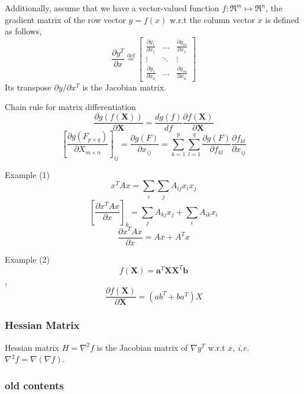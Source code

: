  Additionally, assume that we have a vector-valued function
 $f:\Re^m\mapsto\Re^n$, the gradient matrix of the row vector
 $y=f(x)$ w.r.t the column vector $x$ is defined as follows,
 $$ \frac{\partial y^T}{\partial x} \overset{\text{def}}{=} \begin{bmatrix}
	 \frac{\partial y_1}{\partial x_1} & \ldots &
		\frac{\partial y_m}{\partial x_1} \\
	\vdots & \ddots & \vdots \\
	 \frac{\partial y_1}{\partial x_n} & \ldots &
		\frac{\partial y_m}{\partial x_n} \end{bmatrix}$$
 Its transpose $\partial y/\partial x^T$ is the Jacobian matrix.

 Chain rule for matrix differentiation
 $$\frac{\partial g(f(\mathbf{X}))}{\partial \mathbf{X}} =
 \frac{dg(f)}{df} \frac{\partial f(\mathbf{X})}{\partial \mathbf{X}}$$
 $$[\frac{\partial g(F_{p\times q})}{\partial X_{m\times n}}]_{ij} = \frac{\partial g(F)}{\partial x_{ij}}
 = \sum_{k=1}^p \sum_{l=1}^q \frac{\partial g(F)}{\partial f_{kl}}
 \frac{\partial f_{kl}}{\partial x_{ij}}$$


 Example (1) $$x^TAx = \sum_i \sum_j A_{ij} x_i x_j$$
 $$[\frac{\partial x^TAx}{\partial x}]_k = \sum_j A_{kj}x_j + \sum_i A_{ik}x_i$$
 $$\frac{\partial x^TAx}{\partial x} = Ax + A^Tx$$

 Example (2) $$f(\mathbf{X}) = \mathbf{a}^T\mathbf{X}\mathbf{X}^T\mathbf{b}$$,
 $$\frac{\partial f(\mathbf{X})}{\partial \mathbf{X}} = (ab^T + ba^T)X$$

 \subsubsection{Hessian Matrix}

 Hessian matrix $H = \nabla^2 f$ is the Jacobian matrix of
 $\nabla y^T$ w.r.t $x$, {\it i.e.}
 $\nabla^2 f = \nabla(\nabla f)$.

 \subsubsection{old contents}

